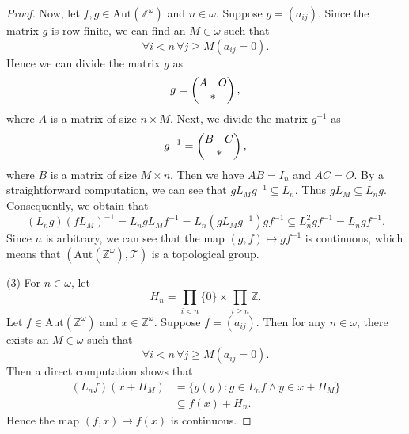 \documentclass[11pt]{amsart}
\theoremstyle{definition}
\theoremstyle{remark}
\numberwithin{equation}{section}
\def\Z {{\mathbb{Z}}}
\def\aut{{\mathrm{Aut}}}
\begin{document}
\begin{proof}
    Now, let $f,g\in\aut(\Z^\omega)$ and $n\in\omega$. Suppose $g=(a_{ij})$. Since the matrix $g$ is row-finite, we can find an $M\in\omega$ such that
    $$\forall i<n\,\forall j\geq M\left(a_{ij}=0\right).$$
    Hence we can divide the matrix $g$ as
    \begin{equation*}
        g=\begin{pmatrix}
            A & O\\
            \multicolumn{2}{c}{*}
        \end{pmatrix},
    \end{equation*}
    where $A$ is a matrix of size $n\times M$. Next, we divide the matrix $g^{-1}$ as
    \begin{equation*}
        g^{-1}=\begin{pmatrix}
            B & C\\
            \multicolumn{2}{c}{*}
        \end{pmatrix},
    \end{equation*}
    where $B$ is a matrix of size $M\times n$. Then we have $AB=I_n$ and $AC=O$. By a straightforward computation, we can see that $gL_Mg^{-1}\subseteq L_n$. Thus $gL_M\subseteq L_ng$. Consequently, we obtain that
    $$(L_ng)(fL_M)^{-1}=L_ngL_Mf^{-1}=L_n(gL_Mg^{-1})gf^{-1}\subseteq L_n^2gf^{-1}=L_ngf^{-1}.$$
    Since $n$ is arbitrary, we can see that the map $(g,f)\mapsto gf^{-1}$ is continuous, which means that $(\aut(\Z^\omega),\mathcal{T})$ is a topological group.

    (3) For $n\in\omega$, let
    $$H_n=\prod_{i<n}\{0\}\times\prod_{i\geq n}\Z.$$
    Let $f\in\aut(\Z^\omega)$ and $x\in\Z^\omega$. Suppose $f=(a_{ij})$. Then for any $n\in\omega$, there exists an $M\in\omega$ such that
    $$\forall i< n\,\forall j\geq M\left(a_{ij}=0\right).$$
    Then a direct computation shows that
    \begin{align*}
        (L_nf)(x+H_M)&=\{g(y):g\in L_nf\land y\in x+H_M\}\\
        &\subseteq f(x)+H_n.
    \end{align*}
    Hence the map $(f,x)\mapsto f(x)$ is continuous.
\end{proof}
\end{document}
